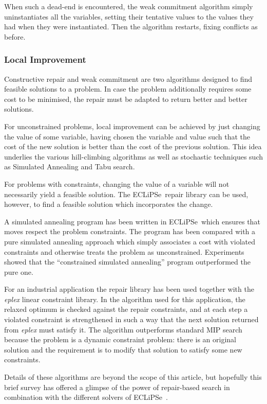 \documentclass[a4wide]{article}
\newcommand{\ECL}{\mbox{ECLiPSe\ }{\hspace{1mm}}}
\begin{document}
When such a dead-end is encountered, the weak commitment algorithm
simply uninstantiates all the variables, setting their tentative
values to the values they had when they were instantiated.
Then the algorithm restarts, fixing conflicts as before.

\subsubsection{Local Improvement}
Constructive repair and weak commitment are two algorithms designed to
find feasible solutions to a problem.
In case the problem additionally requires some cost to be minimised,
the repair must be adapted to return better and better solutions.

For unconstrained problems, local improvement can be achieved by just
changing the value of some variable, having chosen the variable and
value such that the cost of the new solution is better than the cost
of the previous solution.
This idea underlies the various hill-climbing algorithms as well as
stochastic techniques such as Simulated Annealing and Tabu search.

For problems with constraints, changing the value of a variable will
not necessarily yield a feasible solution.
The \ECL repair library can be used, however, to find a feasible
solution which incorporates the change.

A simulated annealing program has been written in \ECL which ensures
that moves respect the problem constraints.
The program has been compared with a pure simulated annealing approach
which simply associates a cost with violated constraints and otherwise
treats the problem as unconstrained.
Experiments showed that the ``constrained simulated annealing''
program outperformed the pure one.

For an industrial application the repair library has been used
together with the {\em eplex} linear constraint library.
In the algorithm used for this application, the relaxed optimum is
checked against the repair 
constraints, and at each step a violated constraint is strengthened in
such a 
way that the next solution returned from {\em eplex} must satisfy it.
The algorithm outperforms standard MIP search because the problem is a
dynamic constraint problem: there is an original solution and the
requirement is to modify that solution to satisfy some new
constraints.

Details of these algorithms are beyond the scope of this article, but
hopefully this brief survey has offered a glimpse of the power of
repair-based search in combination with the different solvers of \ECL.
\end{document}
